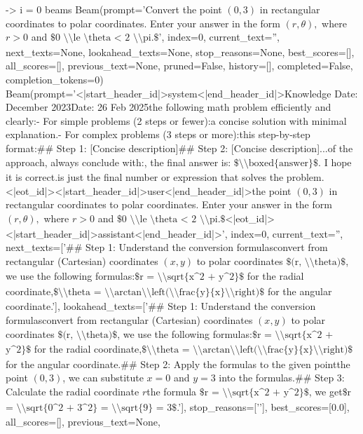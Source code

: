 -> i = 0
beams
Beam(prompt='Convert the point $(0,3)$ in rectangular coordinates to polar coordinates.  Enter your answer in the form $(r,\theta),$ where $r > 0$ and $0 \\le \theta < 2 \\pi.$', index=0, current_text='', next_texts=None, lookahead_texts=None, stop_reasons=None, best_scores=[], all_scores=[], previous_text=None, pruned=False, history=[], completed=False, completion_tokens=0)
Beam(prompt='<|start_header_id|>system<|end_header_id|>\n\nCutting Knowledge Date: December 2023\nToday Date: 26 Feb 2025\n\nSolve the following math problem efficiently and clearly:\n\n- For simple problems (2 steps or fewer):\nProvide a concise solution with minimal explanation.\n\n- For complex problems (3 steps or more):\nUse this step-by-step format:\n\n## Step 1: [Concise description]\n\n## Step 2: [Concise description]\n\n...\n\nRegardless of the approach, always conclude with:\n\nTherefore, the final answer is: $\\boxed{answer}$. I hope it is correct.\n\nWhere [answer] is just the final number or expression that solves the problem.<|eot_id|><|start_header_id|>user<|end_header_id|>\n\nConvert the point $(0,3)$ in rectangular coordinates to polar coordinates.  Enter your answer in the form $(r,\theta),$ where $r > 0$ and $0 \\le \theta < 2 \\pi.$<|eot_id|><|start_header_id|>assistant<|end_header_id|>\n\n', index=0, current_text='', next_texts=['## Step 1: Understand the conversion formulas\nTo convert from rectangular (Cartesian) coordinates $(x, y)$ to polar coordinates $(r, \\theta)$, we use the following formulas:\n$r = \\sqrt{x^2 + y^2}$ for the radial coordinate,\n$\\theta = \\arctan\\left(\\frac{y}{x}\\right)$ for the angular coordinate.\n\n'], lookahead_texts=['## Step 1: Understand the conversion formulas\nTo convert from rectangular (Cartesian) coordinates $(x, y)$ to polar coordinates $(r, \\theta)$, we use the following formulas:\n$r = \\sqrt{x^2 + y^2}$ for the radial coordinate,\n$\\theta = \\arctan\\left(\\frac{y}{x}\\right)$ for the angular coordinate.\n\n## Step 2: Apply the formulas to the given point\nGiven the point $(0, 3)$, we can substitute $x = 0$ and $y = 3$ into the formulas.\n\n## Step 3: Calculate the radial coordinate $r$\nUsing the formula $r = \\sqrt{x^2 + y^2}$, we get\n$r = \\sqrt{0^2 + 3^2} = \\sqrt{9} = 3$.\n\n'], stop_reasons=['\n\n'], best_scores=[0.0], all_scores=[], previous_text=None, 